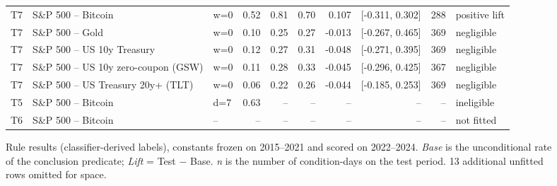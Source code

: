 \begin{figure}[t]
{\begin{tabular}{lllrrrrrrl}
T7 & S\&P 500 -- Bitcoin & w=0 & 0.52 & 0.81 & 0.70 & 0.107 & [-0.311, 0.302] & 288 & positive lift \\
T7 & S\&P 500 -- Gold & w=0 & 0.10 & 0.25 & 0.27 & -0.013 & [-0.267, 0.465] & 369 & negligible \\
T7 & S\&P 500 -- US 10y Treasury & w=0 & 0.12 & 0.27 & 0.31 & -0.048 & [-0.271, 0.395] & 369 & negligible \\
T7 & S\&P 500 -- US 10y zero-coupon (GSW) & w=0 & 0.11 & 0.28 & 0.33 & -0.045 & [-0.296, 0.425] & 367 & negligible \\
T7 & S\&P 500 -- US Treasury 20y+ (TLT) & w=0 & 0.06 & 0.22 & 0.26 & -0.044 & [-0.185, 0.253] & 369 & negligible \\
T5 & S\&P 500 -- Bitcoin & d=7 & 0.63 & -- & -- & -- & -- & -- & ineligible \\
T6 & S\&P 500 -- Bitcoin & -- & -- & -- & -- & -- & -- & -- & not fitted \\
\bottomrule
\end{tabular}
}
\caption{Rule results (classifier-derived labels), constants frozen on 2015--2021 and scored on 2022--2024. \emph{Base} is the unconditional rate of the conclusion predicate; \emph{Lift} = Test $-$ Base. \emph{n} is the number of condition-days on the test period. 13 additional unfitted rows omitted for space.}
\label{tab:rule-results_classifier-pub}
\end{figure}
